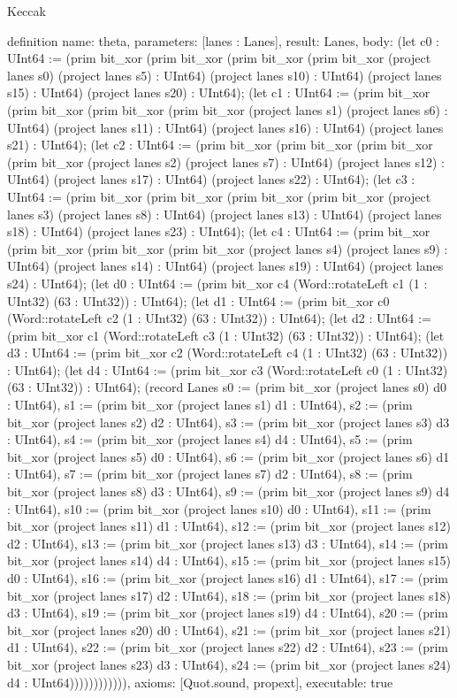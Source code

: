 \begin{lexlean}{Keccak}
\begin{semanticmodule}
definition{
  name: theta,
  parameters: [lanes : Lanes],
  result: Lanes,
  body: (let c0 : UInt64 := (prim bit_xor (prim bit_xor (prim bit_xor (prim bit_xor (project lanes s0) (project lanes s5) : UInt64) (project lanes s10) : UInt64) (project lanes s15) : UInt64) (project lanes s20) : UInt64); (let c1 : UInt64 := (prim bit_xor (prim bit_xor (prim bit_xor (prim bit_xor (project lanes s1) (project lanes s6) : UInt64) (project lanes s11) : UInt64) (project lanes s16) : UInt64) (project lanes s21) : UInt64); (let c2 : UInt64 := (prim bit_xor (prim bit_xor (prim bit_xor (prim bit_xor (project lanes s2) (project lanes s7) : UInt64) (project lanes s12) : UInt64) (project lanes s17) : UInt64) (project lanes s22) : UInt64); (let c3 : UInt64 := (prim bit_xor (prim bit_xor (prim bit_xor (prim bit_xor (project lanes s3) (project lanes s8) : UInt64) (project lanes s13) : UInt64) (project lanes s18) : UInt64) (project lanes s23) : UInt64); (let c4 : UInt64 := (prim bit_xor (prim bit_xor (prim bit_xor (prim bit_xor (project lanes s4) (project lanes s9) : UInt64) (project lanes s14) : UInt64) (project lanes s19) : UInt64) (project lanes s24) : UInt64); (let d0 : UInt64 := (prim bit_xor c4 (Word::rotateLeft c1 (1 : UInt32) (63 : UInt32)) : UInt64); (let d1 : UInt64 := (prim bit_xor c0 (Word::rotateLeft c2 (1 : UInt32) (63 : UInt32)) : UInt64); (let d2 : UInt64 := (prim bit_xor c1 (Word::rotateLeft c3 (1 : UInt32) (63 : UInt32)) : UInt64); (let d3 : UInt64 := (prim bit_xor c2 (Word::rotateLeft c4 (1 : UInt32) (63 : UInt32)) : UInt64); (let d4 : UInt64 := (prim bit_xor c3 (Word::rotateLeft c0 (1 : UInt32) (63 : UInt32)) : UInt64); (record Lanes {s0 := (prim bit_xor (project lanes s0) d0 : UInt64), s1 := (prim bit_xor (project lanes s1) d1 : UInt64), s2 := (prim bit_xor (project lanes s2) d2 : UInt64), s3 := (prim bit_xor (project lanes s3) d3 : UInt64), s4 := (prim bit_xor (project lanes s4) d4 : UInt64), s5 := (prim bit_xor (project lanes s5) d0 : UInt64), s6 := (prim bit_xor (project lanes s6) d1 : UInt64), s7 := (prim bit_xor (project lanes s7) d2 : UInt64), s8 := (prim bit_xor (project lanes s8) d3 : UInt64), s9 := (prim bit_xor (project lanes s9) d4 : UInt64), s10 := (prim bit_xor (project lanes s10) d0 : UInt64), s11 := (prim bit_xor (project lanes s11) d1 : UInt64), s12 := (prim bit_xor (project lanes s12) d2 : UInt64), s13 := (prim bit_xor (project lanes s13) d3 : UInt64), s14 := (prim bit_xor (project lanes s14) d4 : UInt64), s15 := (prim bit_xor (project lanes s15) d0 : UInt64), s16 := (prim bit_xor (project lanes s16) d1 : UInt64), s17 := (prim bit_xor (project lanes s17) d2 : UInt64), s18 := (prim bit_xor (project lanes s18) d3 : UInt64), s19 := (prim bit_xor (project lanes s19) d4 : UInt64), s20 := (prim bit_xor (project lanes s20) d0 : UInt64), s21 := (prim bit_xor (project lanes s21) d1 : UInt64), s22 := (prim bit_xor (project lanes s22) d2 : UInt64), s23 := (prim bit_xor (project lanes s23) d3 : UInt64), s24 := (prim bit_xor (project lanes s24) d4 : UInt64)}))))))))))),
  axioms: [Quot.sound, propext],
  executable: true
}


\end{semanticmodule}
\end{lexlean}
